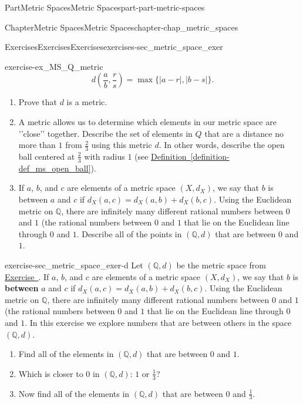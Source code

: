 \documentclass[oneside,10pt,]{book}
\newcommand{\xreffont}{\relax}
\newcommand{\terminology}[1]{\textbf{#1}}
\numberwithin{equation}{chapter}
\newcommand{\Q}{\mathbb{Q}}
\begin{document}
\begin{partptx}{Part}{Metric Spaces}{}{Metric Spaces}{}{}{part-part-metric-spaces}
\begin{chapterptx}{Chapter}{Metric Spaces}{}{Metric Spaces}{}{}{chapter-chap_metric_spaces}
\begin{exercises-section}{Exercises}{Exercises}{}{Exercises}{}{}{exercises-sec_metric_space_exer}
\begin{divisionexercise}{3}{}{}{exercise-ex_MS_Q_metric}
\begin{equation*}
d\left(\frac{a}{b}, \frac{r}{s}\right) = \max\{| a-r |, | b-s |\}\text{.}
\end{equation*}
%
\begin{enumerate}[font=\bfseries,label=(\alph*),ref=\alph*]%
\item{}Prove that \(d\) is a metric.%
\item{}A metric allows us to determine which elements in our metric space are '{}'{}close'{}'{} together. Describe the set of elements in \(Q\) that are a distance no more than \(1\) from \(\frac{2}{3}\) using this metric \(d\). In other words, describe the open ball centered at \(\frac{2}{3}\) with radius \(1\) (see \hyperref[definition-def_ms_open_ball]{Definition~{\xreffont\ref{definition-def_ms_open_ball}}}).%
\item{}If \(a\), \(b\), and \(c\) are elements of a metric space \((X, d_X)\), we say that \(b\) is between \(a\) and \(c\) if \(d_X(a,c) = d_X(a,b) + d_X(b,c)\). Using the Euclidean metric on \(\Q\), there are infinitely many different rational numbers between \(0\) and \(1\) (the rational numbers between \(0\) and \(1\) that lie on the Euclidean line through \(0\) and \(1\). Describe all of the points in \((\Q,d)\) that are between \(0\) and \(1\).%
\end{enumerate}%
\end{divisionexercise}%
\begin{divisionexercise}{4}{}{}{exercise-sec_metric_space_exer-d}%
Let \((\Q,d)\) be the metric space from \hyperlink{exercise-ex_MS_Q_metric}{Exercise~{\xreffont 3}}. If \(a\), \(b\), and \(c\) are elements of a metric space \((X, d_X)\), we say that \(b\) is \terminology{between} \(a\) and \(c\) if \(d_X(a,c) = d_X(a,b) + d_X(b,c)\). Using the Euclidean metric on \(\Q\), there are infinitely many different rational numbers between \(0\) and \(1\) (the rational numbers between \(0\) and \(1\) that lie on the Euclidean line through \(0\) and \(1\). In this exercise we explore numbers that are between others in the space \((\Q,d)\).%
\begin{enumerate}[font=\bfseries,label=(\alph*),ref=\alph*]%
\item{}Find all of the elements in \((\Q,d)\) that are between \(0\) and \(1\).%
\item{}Which is closer to \(0\) in \((\Q,d)\): \(1\) or \(\frac{1}{3}\)?%
\item{}Now find all of the elements in \((\Q,d)\) that are between \(0\) and \(\frac{1}{3}\).%
\end{enumerate}%

\end{divisionexercise}
\end{exercises-section}
\end{chapterptx}
\end{partptx}
\end{document}
